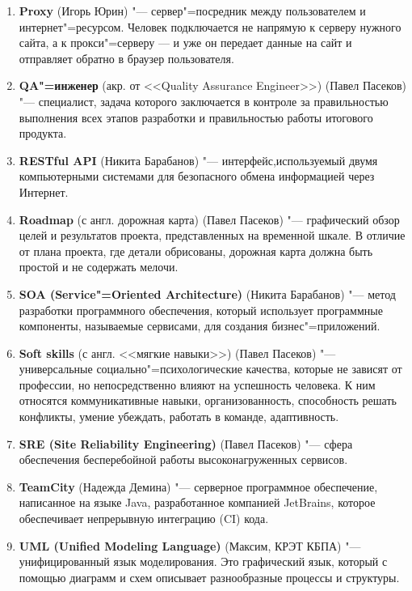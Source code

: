 \documentclass[12pt]{article}
\begin{document}
\begin{enumerate}
    \item \textbf{Proxy} (Игорь Юрин) "--- сервер"=посредник между пользователем и интернет"=ресурсом. Человек подключается не напрямую к серверу нужного сайта, а к прокси"=серверу — и уже он передает данные на сайт и отправляет обратно в браузер пользователя.

    \item \textbf{QA"=инженер} (акр. от <<Quality Assurance Engineer>>) (Павел Пасеков) "--- специалист, задача которого заключается в контроле за правильностью выполнения всех этапов разработки и правильностью работы итогового продукта.

    \item \textbf{RESTful API} (Никита Барабанов) "--- интерфейс,используемый двумя компьютерными системами для безопасного обмена информацией через Интернет. 

    \item \textbf{Roadmap} (с англ. дорожная карта)  (Павел Пасеков) "--- графический обзор целей и результатов проекта, представленных на временной шкале. В отличие от плана проекта, где детали обрисованы, дорожная карта должна быть простой и не содержать мелочи.

    \item \textbf{SOA (Service"=Oriented Architecture)} (Никита Барабанов) "--- метод разработки программного обеспечения, который использует программные компоненты, называемые сервисами, для создания бизнес"=приложений.
    
    \item \textbf{Soft skills} (с англ. <<мягкие навыки>>) (Павел Пасеков) "--- универсальные социально"=психологические качества, которые не зависят от профессии, но непосредственно влияют на успешность человека. К ним относятся коммуникативные навыки, организованность, способность решать конфликты, умение убеждать, работать в команде, адаптивность.
    
    \item \textbf{SRE (Site Reliability Engineering)} (Павел Пасеков) "--- сфера обеспечения бесперебойной работы высоконагруженных сервисов.
  
    \item \textbf{TeamCity} (Надежда Демина) "--- серверное программное обеспечение, написанное на языке Java, разработанное компанией JetBrains, которое обеспечивает непрерывную интеграцию (CI) кода.

    \item \textbf{UML (Unified Modeling Language)} (Максим, КРЭТ КБПА) "--- унифицированный язык моделирования. Это графический язык, который с помощью диаграмм и схем описывает разнообразные процессы и структуры.


\end{enumerate}
\end{document}

